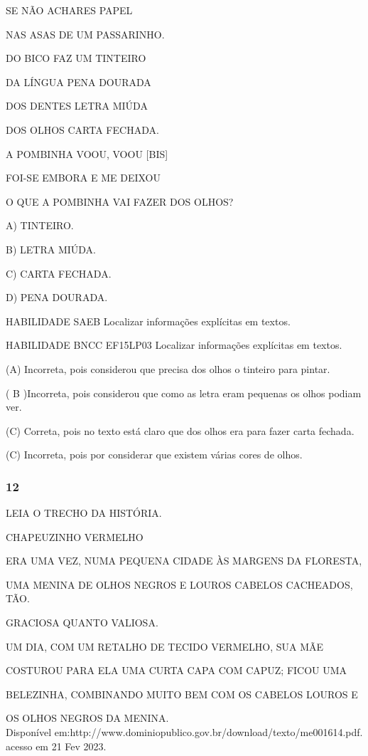 \begin{escola}
SE NÃO ACHARES PAPEL

NAS ASAS DE UM PASSARINHO.

DO BICO FAZ UM TINTEIRO

DA LÍNGUA PENA DOURADA

DOS DENTES LETRA MIÚDA

DOS OLHOS CARTA FECHADA.

A POMBINHA VOOU, VOOU {[}BIS{]}

FOI-SE EMBORA E ME DEIXOU

O QUE A POMBINHA VAI FAZER DOS OLHOS?

A) TINTEIRO.

B) LETRA MIÚDA.

C) CARTA FECHADA.

D) PENA DOURADA.

HABILIDADE SAEB Localizar informações explícitas em textos.

HABILIDADE BNCC EF15LP03 Localizar informações explícitas em textos.

(A) Incorreta, pois considerou que precisa dos olhos o tinteiro para
pintar.

( B )Incorreta, pois considerou que como as letra eram pequenas os olhos
podiam ver.

(C) Correta, pois no texto está claro que dos olhos era para fazer carta
fechada.

(C) Incorreta, pois por considerar que existem várias cores de
olhos.\protect\hypertarget{_heading=h.xyn2rjyn0l4h}{}{}

\subsubsection{12}\label{section-84}

LEIA O TRECHO DA HISTÓRIA.

CHAPEUZINHO VERMELHO

ERA UMA VEZ, NUMA PEQUENA CIDADE ÀS MARGENS DA FLORESTA,

UMA MENINA DE OLHOS NEGROS E LOUROS CABELOS CACHEADOS, TÃO.

GRACIOSA QUANTO VALIOSA.

UM DIA, COM UM RETALHO DE TECIDO VERMELHO, SUA MÃE

COSTUROU PARA ELA UMA CURTA CAPA COM CAPUZ; FICOU UMA

BELEZINHA, COMBINANDO MUITO BEM COM OS CABELOS LOUROS E

OS OLHOS NEGROS DA MENINA.\\
Disponível
em:http://www.dominiopublico.gov.br/download/texto/me001614.pdf. acesso
em 21 Fev 2023.


\end{escola}
